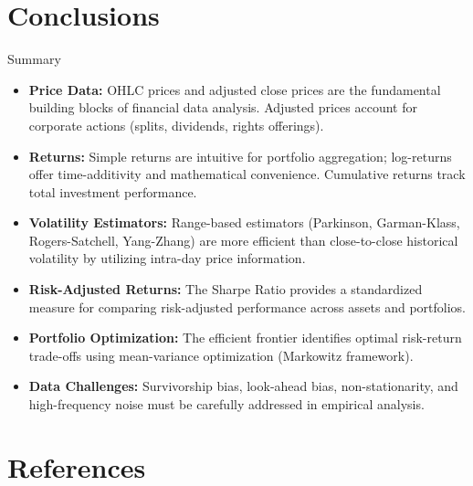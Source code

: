 \documentclass[9pt, aspectratio=169, t]{beamer}
\theoremstyle{definition}
\begin{document}
\section{Conclusions}

\begin{frame}{Summary}

\begin{itemize}
    \item \textbf{Price Data:} OHLC prices and adjusted close prices are the fundamental building blocks of financial data analysis. Adjusted prices account for corporate actions (splits, dividends, rights offerings).

    \item \textbf{Returns:} Simple returns are intuitive for portfolio aggregation; log-returns offer time-additivity and mathematical convenience. Cumulative returns track total investment performance.

    \item \textbf{Volatility Estimators:} Range-based estimators (Parkinson, Garman-Klass, Rogers-Satchell, Yang-Zhang) are more efficient than close-to-close historical volatility by utilizing intra-day price information.

    \item \textbf{Risk-Adjusted Returns:} The Sharpe Ratio provides a standardized measure for comparing risk-adjusted performance across assets and portfolios.

    \item \textbf{Portfolio Optimization:} The efficient frontier identifies optimal risk-return trade-offs using mean-variance optimization (Markowitz framework).

    \item \textbf{Data Challenges:} Survivorship bias, look-ahead bias, non-stationarity, and high-frequency noise must be carefully addressed in empirical analysis.
\end{itemize}

\end{frame}

\section{References}
\end{document}
